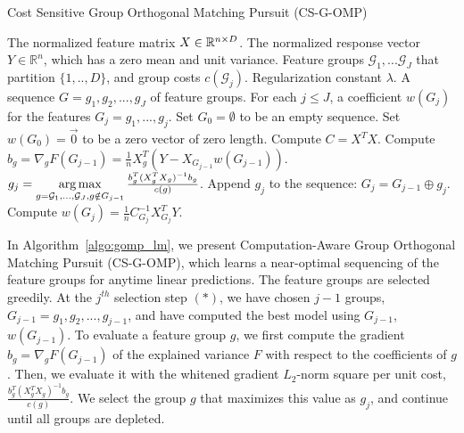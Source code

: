 \begin{algorithm}[tb]
\caption{Cost Sensitive Group Orthogonal Matching Pursuit (CS-G-OMP)}
 \label{algo:gomp_lm}
\begin{algorithmic}[1]
	 The normalized feature matrix $X \in \mathbb{R}^{n \times D}$.
 	The normalized response vector $Y \in \mathbb{R}^{n}$, which has a zero mean and unit variance. 
    Feature groups $\mathcal{G}_1, ... \mathcal{G}_J$ that partition $\{1,..,D\}$, and group costs $c(\mathcal{G}_j)$.
   Regularization constant $\lambda$.
	 A sequence $G = g_1, g_2, ..., g_{J}$ of feature groups.
   For each $j \leq J$, a coefficient  $w(G_j)$ for the features $G_j = g_1,..., g_j$. 
    \STATE Set $G_0 = \emptyset$ to be an empty sequence.
    \STATE Set $w(G_0) = \vec{0}$ to be a zero vector of zero length.
    \STATE Compute $C = X^TX$. 
        \STATE Compute $b_g = \nabla _g F(G_{j-1}) = \frac{1}{n} X_g^T(Y-X_{G_{j-1}}w(G_{j-1}))$.
        \label{algline:gomp_bg}
    \ENDFOR
    \STATE $g_{j} = \operatorname*{arg\,max} \limits_{g = \mathcal{G}_1, ... , \mathcal{G}_J, g\notin G_{j-1}} \frac{b_g ^T (X_{g}^TX_g)^{-1}b_g}{ c(g) }$.
   \STATE Append $g_j$ to the sequence: $G_{j} = G_{j-1} \oplus g_{j}$.
   \STATE Compute $w(G_j) = \frac{1}{n}C_{G_{j}}^{-1}X_{G_{j}}^TY$.
 \ENDFOR
\end{algorithmic}
\end{algorithm}

 
In Algorithm~\ref{algo:gomp_lm}, we present Computation-Aware Group Orthogonal Matching Pursuit (CS-G-OMP), 
which learns a near-optimal sequencing of the feature groups for anytime linear predictions. 
The feature groups are selected greedily. At the $j^{th}$ selection step $(*)$, we have chosen $j-1$ groups,
$G_{j-1} = g_1, g_2, ..., g_{j-1}$, and have computed 
the best model using $G_{j-1}$, $w(G_{j-1})$. 
To evaluate a feature group $g$,
we first compute the gradient $b_g = \nabla _g F(G_{j-1})$ of the 
explained variance $F$ with respect to the coefficients of $g$.
Then, we evaluate it with the whitened gradient $L_2$-norm square per unit cost, 
$\frac{b_g ^T (X_{g}^TX_g)^{-1}b_g}{ c(g) }$. We select the group $g$ that 
maximizes this value as $g_j$, and continue until all groups
are depleted. 

